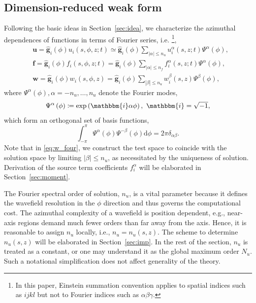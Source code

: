 \documentclass[extra,referee]{gji}
\begin{document}
\subsection{Dimension-reduced weak form}
Following the basic ideas in Section~\ref{sec:idea}, we characterize 
the azimuthal dependences of functions in terms of Fourier series,
i.e.%
\footnote{In this paper, Einstein summation convention applies to 
spatial indices such as $ijkl$ but not to Fourier indices such as
$\alpha\beta\gamma$.},
\begin{align}
  & \mathbf{u}=\hat{\mathbf{g}}_{i}\left(\phi\right) u_i\!\left(s,\phi,z;t\right) 
  \simeq \hat{\mathbf{g}}_{i}\left(\phi\right) \!\sum_{|\alpha|\le n_u} \!
  u_i^\alpha\!\left(s,z;t\right)\Psi^\alpha\left(\phi\right),
  \label{eq:u_four}\\[.5em]
  & \mathbf{f}=\hat{\mathbf{g}}_{i}\left(\phi\right) f_i\left(s,\phi,z;t\right) 
  = \hat{\mathbf{g}}_{i}\left(\phi\right) \!\sum_{|\alpha|\le n_f}\! 
  f_i^\alpha\left(s,z;t\right)\Psi^\alpha\left(\phi\right),
  \label{eq:f_four}\\[.5em]
  & \mathbf{w}=\hat{\mathbf{g}}_{i}\left(\phi\right) w_i\left(s,\phi,z\right) 
  = \hat{\mathbf{g}}_{i}\left(\phi\right) \sum_{|\beta|\le n_u} 
  w_i^\beta\left(s,z\right)\Psi^\beta\left(\phi\right),
  \label{eq:w_four}
\end{align}
where $\Psi^\alpha\left(\phi\right), \alpha=-n_u,\dots,n_u$ denote the Fourier modes, 
\begin{equation}
  \Psi^\alpha\left(\phi\right)\coloneqq\exp\left(\mathbbm{i}\alpha\phi\right),\ \mathbbm{i}=\sqrt{-1},
\end{equation}
which form an orthogonal set of basis functions,
\begin{equation}
  \int_{-\pi}^{\pi}\Psi^\alpha\left(\phi\right)\Psi^{-\beta}\left(\phi\right)\text{d}\phi=
  2\pi\delta_{\alpha\beta}.
  \label{eq:orth}
\end{equation}
Note that in \eqref{eq:w_four}, we construct the test space to coincide 
with the solution space by limiting $|\beta|\le n_u$, as necessitated by
the uniqueness of solution. Derivation of the source term
coefficients $f_i^\alpha$ will be elaborated in Section~\ref{sec:moment}.

The Fourier spectral order of solution, $n_u$, is a vital parameter 
because it defines the wavefield resolution in the $\phi$
direction and thus governs the computational cost. 
The azimuthal complexity of a wavefield is position dependent, 
e.g., near-axis regions demand much fewer orders than
far away from the axis. Hence, it is reasonable to assign 
$n_u$ locally, i.e., $n_u=n_u\left(s,z\right)$. The scheme to determine 
$n_u\left(s,z\right)$ will be elaborated in Section~\ref{sec:imp}. In the 
rest of the section, $n_u$ is treated as a constant, or one may
understand it as the global maximum order $N_u$. 
Such a notational simplification
does not affect generality of the theory. 
\end{document}
